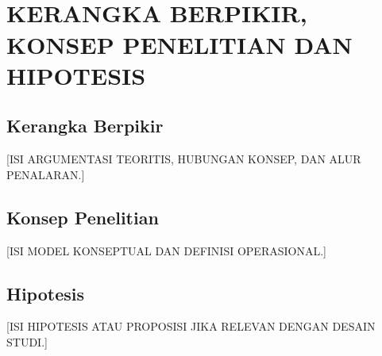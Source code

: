 \chapter[KERANGKA BERPIKIR, KONSEP PENELITIAN DAN HIPOTESIS]{\\ KERANGKA BERPIKIR, KONSEP PENELITIAN DAN HIPOTESIS}
\section{Kerangka Berpikir}
[ISI ARGUMENTASI TEORITIS, HUBUNGAN KONSEP, DAN ALUR PENALARAN.]

\section{Konsep Penelitian}
[ISI MODEL KONSEPTUAL DAN DEFINISI OPERASIONAL.]

\section{Hipotesis}
[ISI HIPOTESIS ATAU PROPOSISI JIKA RELEVAN DENGAN DESAIN STUDI.]
